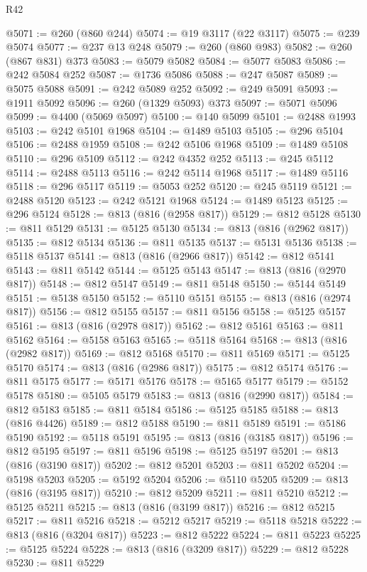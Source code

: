 \begin{lexlean}{R42}
\begin{coremodule}
{@5071 := @260 (@860 @244)
@5074 := @19 @3117 (@22 @3117)
@5075 := @239 @5074
@5077 := @237 @13 @248
@5079 := @260 (@860 @983)
@5082 := @260 (@867 @831) @373
@5083 := @5079 @5082
@5084 := @5077 @5083
@5086 := @242 @5084 @252
@5087 := @1736 @5086
@5088 := @247 @5087
@5089 := @5075 @5088
@5091 := @242 @5089 @252
@5092 := @249 @5091
@5093 := @1911 @5092
@5096 := @260 (@1329 @5093) @373
@5097 := @5071 @5096
@5099 := @4400 (@5069 @5097)
@5100 := @140 @5099
@5101 := @2488 @1993
@5103 := @242 @5101 @1968
@5104 := @1489 @5103
@5105 := @296 @5104
@5106 := @2488 @1959
@5108 := @242 @5106 @1968
@5109 := @1489 @5108
@5110 := @296 @5109
@5112 := @242 @4352 @252
@5113 := @245 @5112
@5114 := @2488 @5113
@5116 := @242 @5114 @1968
@5117 := @1489 @5116
@5118 := @296 @5117
@5119 := @5053 @252
@5120 := @245 @5119
@5121 := @2488 @5120
@5123 := @242 @5121 @1968
@5124 := @1489 @5123
@5125 := @296 @5124
@5128 := @813 (@816 (@2958 @817))
@5129 := @812 @5128
@5130 := @811 @5129
@5131 := @5125 @5130
@5134 := @813 (@816 (@2962 @817))
@5135 := @812 @5134
@5136 := @811 @5135
@5137 := @5131 @5136
@5138 := @5118 @5137
@5141 := @813 (@816 (@2966 @817))
@5142 := @812 @5141
@5143 := @811 @5142
@5144 := @5125 @5143
@5147 := @813 (@816 (@2970 @817))
@5148 := @812 @5147
@5149 := @811 @5148
@5150 := @5144 @5149
@5151 := @5138 @5150
@5152 := @5110 @5151
@5155 := @813 (@816 (@2974 @817))
@5156 := @812 @5155
@5157 := @811 @5156
@5158 := @5125 @5157
@5161 := @813 (@816 (@2978 @817))
@5162 := @812 @5161
@5163 := @811 @5162
@5164 := @5158 @5163
@5165 := @5118 @5164
@5168 := @813 (@816 (@2982 @817))
@5169 := @812 @5168
@5170 := @811 @5169
@5171 := @5125 @5170
@5174 := @813 (@816 (@2986 @817))
@5175 := @812 @5174
@5176 := @811 @5175
@5177 := @5171 @5176
@5178 := @5165 @5177
@5179 := @5152 @5178
@5180 := @5105 @5179
@5183 := @813 (@816 (@2990 @817))
@5184 := @812 @5183
@5185 := @811 @5184
@5186 := @5125 @5185
@5188 := @813 (@816 @4426)
@5189 := @812 @5188
@5190 := @811 @5189
@5191 := @5186 @5190
@5192 := @5118 @5191
@5195 := @813 (@816 (@3185 @817))
@5196 := @812 @5195
@5197 := @811 @5196
@5198 := @5125 @5197
@5201 := @813 (@816 (@3190 @817))
@5202 := @812 @5201
@5203 := @811 @5202
@5204 := @5198 @5203
@5205 := @5192 @5204
@5206 := @5110 @5205
@5209 := @813 (@816 (@3195 @817))
@5210 := @812 @5209
@5211 := @811 @5210
@5212 := @5125 @5211
@5215 := @813 (@816 (@3199 @817))
@5216 := @812 @5215
@5217 := @811 @5216
@5218 := @5212 @5217
@5219 := @5118 @5218
@5222 := @813 (@816 (@3204 @817))
@5223 := @812 @5222
@5224 := @811 @5223
@5225 := @5125 @5224
@5228 := @813 (@816 (@3209 @817))
@5229 := @812 @5228
@5230 := @811 @5229
}
\end{coremodule}
\end{lexlean}
